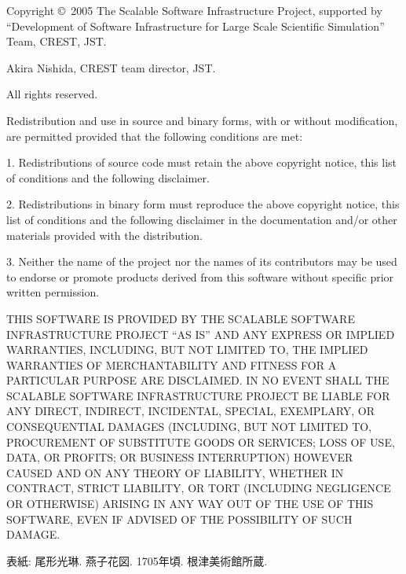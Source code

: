\documentclass[a4paper]{jarticle}
\begin{document}
\newpage
\begin{flushleft}
{\small
Copyright \copyright\ 2005 The Scalable Software Infrastructure Project,
supported by ``Development of Software Infrastructure for Large Scale
Scientific Simulation'' Team, CREST, JST.

Akira Nishida, CREST team director, JST.

All rights reserved.

\vspace*{5mm}
 Redistribution and use in source and binary forms, with or without
 modification, are permitted provided that the following conditions are
 met:

 1. Redistributions of source code must retain the above copyright
 notice, this list of conditions and the following disclaimer.

 2. Redistributions in binary form must reproduce the above copyright
 notice, this list of conditions and the following disclaimer in the
 documentation and/or other materials provided with the distribution.

 3. Neither the name of the project nor the names of its contributors
 may be used to endorse or promote products derived from this software
 without specific prior written permission.

\vspace*{5mm}
 THIS SOFTWARE IS PROVIDED BY THE SCALABLE SOFTWARE INFRASTRUCTURE
 PROJECT ``AS IS'' AND ANY EXPRESS OR IMPLIED WARRANTIES, INCLUDING, BUT
 NOT LIMITED TO, THE IMPLIED WARRANTIES OF MERCHANTABILITY AND FITNESS
 FOR A PARTICULAR PURPOSE ARE DISCLAIMED. IN NO EVENT SHALL THE SCALABLE
 SOFTWARE INFRASTRUCTURE PROJECT BE LIABLE FOR ANY DIRECT, INDIRECT,
 INCIDENTAL, SPECIAL, EXEMPLARY, OR CONSEQUENTIAL DAMAGES (INCLUDING,
 BUT NOT LIMITED TO, PROCUREMENT OF SUBSTITUTE GOODS OR SERVICES; LOSS
 OF USE, DATA, OR PROFITS; OR BUSINESS INTERRUPTION) HOWEVER CAUSED AND
 ON ANY THEORY OF LIABILITY, WHETHER IN CONTRACT, STRICT LIABILITY, OR
 TORT (INCLUDING NEGLIGENCE OR OTHERWISE) ARISING IN ANY WAY OUT OF THE
 USE OF THIS SOFTWARE, EVEN IF ADVISED OF THE POSSIBILITY OF SUCH
 DAMAGE.

\vfill
表紙: 尾形光琳. 燕子花図. 1705年頃. 根津美術館所蔵.
}
\end{flushleft}
\thispagestyle{empty}

\newpage
{}
\tableofcontents

\setcounter{section}{0}

\newpage
\end{document}
